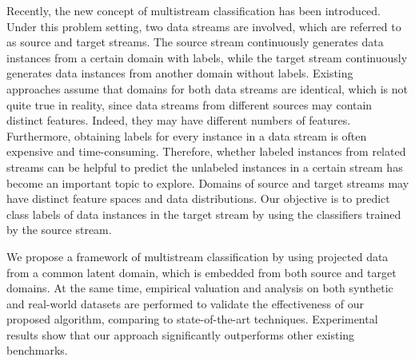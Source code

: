 Recently, the new concept of multistream classification has been introduced. Under this problem setting, 
two data streams are involved, which are referred to as source and target streams. The 
source stream continuously generates data instances from a certain domain with 
labels, while the target stream continuously generates data instances from another 
domain without labels. Existing approaches assume that domains for both data streams 
are identical, which is not quite true in reality, since data streams from different 
sources may contain distinct features. Indeed, they may have different numbers of features. Furthermore, obtaining labels for every instance 
in a data stream is often expensive and time-consuming. Therefore, whether labeled 
instances from related streams can be helpful to predict the unlabeled instances in 
a certain stream has become an important topic to explore.  Domains of 
source and target streams may have distinct feature spaces and data distributions. 
Our objective is to predict class labels of data instances in the target stream by 
using the classifiers trained by the source stream.

We propose a framework of multistream classification by using projected data from a common latent domain, which is embedded from both source and target domains. At the same time, empirical valuation and analysis 
on both synthetic and real-world datasets are performed to validate the effectiveness 
of our proposed algorithm, comparing to state-of-the-art techniques. Experimental results 
show that our approach significantly outperforms other existing benchmarks.